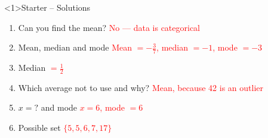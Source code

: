 \documentclass{beamer}
\begin{document}
\begin{frame}<1>{Starter -- Solutions}
\vspace{-0.8em}

\footnotesize
\begin{enumerate}\itemsep2pt
  \item Can you find the mean?  
        \textcolor{red}{No — data is categorical}
  \item Mean, median and mode  
        \textcolor{red}{Mean $=-\frac{3}{7}$, median $=-1$, mode $=-3$}
  \item Median  
        \textcolor{red}{$=\frac{1}{2}$}
  \item Which average not to use and why?  
        \textcolor{red}{Mean, because 42 is an outlier}
  \item $x=?$ and mode  
        \textcolor{red}{$x=6$, mode $=6$}
  \item Possible set  
        \textcolor{red}{$\{5,5,6,7,17\}$}
\end{enumerate}
\end{frame}
\end{document}
